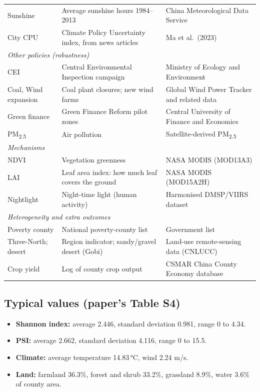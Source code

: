 \documentclass[11pt]{article}
\begin{document}
\begin{table}[H]
\begin{tabularx}{\linewidth}{l>{\raggedright\arraybackslash}X>{\raggedright\arraybackslash}X}
Sunshine & Average sunshine hours 1984--2013 & China Meteorological Data Service\\
City CPU & Climate Policy Uncertainty index, from news articles & Ma et al.\ (2023)\\
\midrule
\multicolumn{3}{l}{\emph{Other policies (robustness)}}\\
CEI & Central Environmental Inspection campaign & Ministry of Ecology and Environment\\
Coal, Wind expansion & Coal plant closures; new wind farms & Global Wind Power Tracker and related data\\
Green finance & Green Finance Reform pilot zones & Central University of Finance and Economics\\
PM\textsubscript{2.5} & Air pollution & Satellite-derived PM\textsubscript{2.5}\\
\midrule
\multicolumn{3}{l}{\emph{Mechanisms}}\\
NDVI & Vegetation greenness & NASA MODIS (MOD13A3)\\
LAI & Leaf area index: how much leaf covers the ground & NASA MODIS (MOD15A2H)\\
Nightlight & Night-time light (human activity) & Harmonised DMSP/VIIRS dataset\\
\midrule
\multicolumn{3}{l}{\emph{Heterogeneity and extra outcomes}}\\
Poverty county & National poverty-county list & Government list\\
Three-North; desert & Region indicator; sandy/gravel desert (Gobi) & Land-use remote-sensing data (CNLUCC)\\
Crop yield & Log of county crop output & CSMAR China County Economy database\\
\bottomrule
\end{tabularx}
\end{table}

\subsection{Typical values (paper's Table S4)}
\begin{itemize}
\item \textbf{Shannon index:} average 2.446, standard deviation 0.981, range 0 to 4.34.
\item \textbf{PSI:} average 2.662, standard deviation 4.116, range 0 to 15.5.
\item \textbf{Climate:} average temperature 14.83\,°C, wind 2.24 m/s.
\item \textbf{Land:} farmland 36.3\%, forest and shrub 33.2\%, grassland 8.9\%, water 3.6\% of county area.
\end{itemize}
\end{document}
